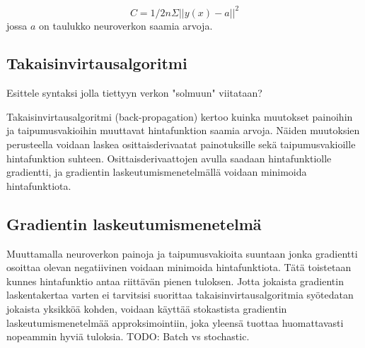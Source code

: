 \documentclass[finnish]{tktltiki2}
\theoremstyle{definition}
\theoremstyle{remark}
\begin{document}
    \begin{equation}
      \label{eq:cost-function}
      C = 1/2n \Sigma || y(x) - a ||^2
    \end{equation}
    jossa $a$ on taulukko neuroverkon saamia arvoja.

  \subsection{Takaisinvirtausalgoritmi}

  Esittele syntaksi jolla tiettyyn verkon "solmuun" viitataan?

  Takaisinvirtausalgoritmi (back-propagation) kertoo kuinka muutokset painoihin ja taipumusvakioihin muuttavat hintafunktion saamia arvoja. Näiden muutoksien perusteella voidaan laskea osittaisderivaatat painotuksille sekä taipumusvakioille hintafunktion suhteen. Osittaisderivaattojen avulla saadaan hintafunktiolle gradientti, ja gradientin laskeutumismenetelmällä voidaan minimoida hintafunktiota.
  

  \subsection{Gradientin laskeutumismenetelmä} %

  Muuttamalla neuroverkon painoja ja taipumusvakioita suuntaan jonka gradientti osoittaa olevan negatiivinen voidaan minimoida hintafunktiota. Tätä toistetaan kunnes hintafunktio antaa riittävän pienen tuloksen. Jotta jokaista gradientin laskentakertaa varten ei tarvitsisi suorittaa takaisinvirtausalgoritmia syötedatan jokaista yksikköä kohden, voidaan käyttää stokastista gradientin laskeutumismenetelmää approksimointiin, joka yleensä tuottaa huomattavasti nopeammin hyviä tuloksia. TODO: Batch vs stochastic.

\end{document}
